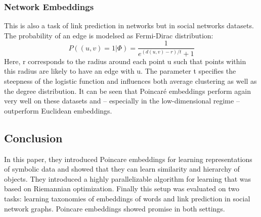 \subsubsection{Network Embeddings}
This is also a task of link prediction in networks but in social networks datasets.  The probability of an edge is modelsed as Fermi-Dirac distribution:
$$P((u,v) = 1 | \Phi)= \frac{1}{e^{(d(u,v)-r)/t}+1}$$
Here, r corresponds to the radius around each point u such that points within this radius are likely to have an edge with u. The parameter t specifies the steepness of the logistic function and influences both average clustering as well as the degree distribution. It can be seen that Poincar\'e embeddings perform again very well on these datasets and – especially in the low-dimensional regime – outperform Euclidean embeddings.
\subsection{Conclusion}
In this paper, they introduced Poincare embeddings for learning representations of symbolic data and showed that they can learn similarity and hierarchy of objects. They introduced a highly parallelizable algorithm for learning that was based on Riemannian optimization. Finally this setup was evaluated on two tasks: learning taxonomies of embeddings of words and link prediction in social network graphs. Poincare embeddings showed promise in both settings. 
